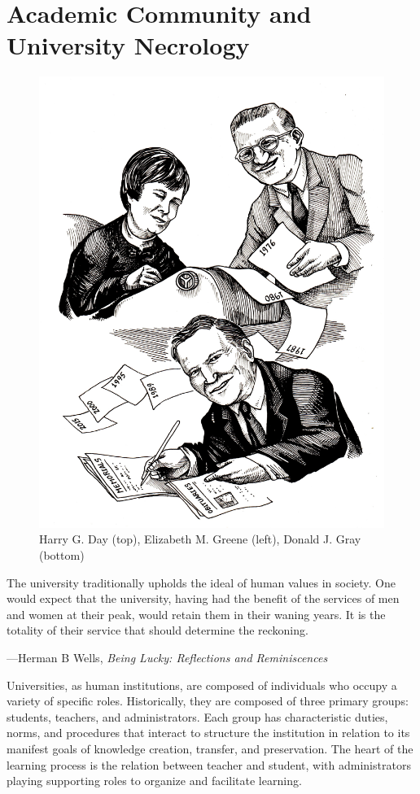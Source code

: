 \documentclass[
  american,
  letterpaper,
]{scrreprt}
\begin{document}

\chapter{Academic Community and University Necrology}\label{sec-nine}

\begin{figure}[H]

{\centering \includegraphics[width=0.6\linewidth,height=\textheight,keepaspectratio]{images/miu9.jpeg}

}

\caption{Harry G. Day (top), Elizabeth M. Greene (left), Donald J. Gray
(bottom)}

\end{figure}%

\epigraph{
The university traditionally upholds the ideal of human values in society. One would expect that the university, having had the benefit of the services of men and women at their peak, would retain them in their waning years. It is the totality of their service that should determine the reckoning.
}
{---Herman B Wells, \textit{Being Lucky: Reflections and Reminiscences}}

Universities, as human institutions, are composed of individuals who
occupy a variety of specific roles. Historically, they are composed of
three primary groups: students, teachers, and administrators. Each group
has characteristic duties, norms, and procedures that interact to
structure the institution in relation to its manifest goals of knowledge
creation, transfer, and preservation. The heart of the learning process
is the relation between teacher and student, with administrators playing
supporting roles to organize and facilitate learning.
\end{document}
